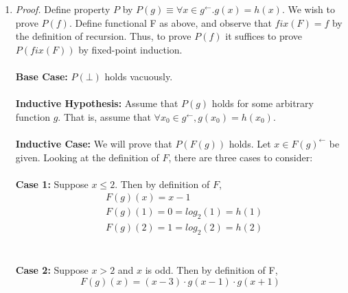 \documentclass{article}
\begin{document}
\begin{enumerate}
\begin{enumerate}
        \item %
        \textit{Proof.} Define property \(P\) by \(P(g) \equiv \forall x \in g^\leftarrow . g(x)=h(x)\).
        We wish to prove \(P(f)\). Define functional F as above, and observe that \(fix(F) = f\) by
        the definition of recursion. Thus, to prove \(P(f)\) it suffices to prove
        \(P(fix(F))\) by fixed-point induction.
        \\~\\
        \textbf{Base Case:} \(P(\bot)\) holds vacuously.
        \\~\\
        \textbf{Inductive Hypothesis:} Assume that \(P(g)\) holds for some arbitrary function \(g\).
        That is, assume that \(\forall x_0 \in g^\leftarrow , g(x_0)=h(x_0)\).
        \\~\\
        \textbf{Inductive Case:} We will prove that \(P (F (g))\) holds.
        Let \(x \in F (g)^\leftarrow\) be given.
        Looking at the definition of \(F\), there are three cases to consider:
        \\~\\
        \textbf{Case 1:} Suppose \(x \leq 2\). Then by definition of \(F\),
        \begin{equation}
            \begin{aligned}
                & F(g)(x) = x - 1 \\
                & F(g)(1) = 0 = log_2(1) = h(1) \\
                & F(g)(2) = 1 = log_2(2) = h(2)
            \end{aligned}
        \end{equation}
        \\~\\
        \textbf{Case 2:} Suppose \(x > 2\) and \(x\) is odd. Then by definition of F,
        \begin{equation}
            F(g)(x) = (x-3) \cdot g(x-1) \cdot g(x+1)
        \end{equation}


\end{enumerate}
\end{enumerate}
\end{document}
